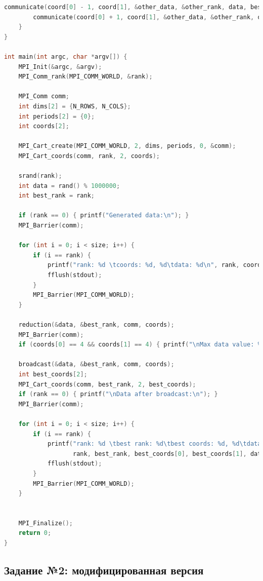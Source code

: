 \documentclass[a4paper]{article}
\begin{document}
\begin{lstlisting}[caption=transputer\_matrix.c, label={lst:1}, language=C]
        communicate(coord[0] - 1, coord[1], &other_data, &other_rank, data, best_rank, send, comm);
        communicate(coord[0] + 1, coord[1], &other_data, &other_rank, data, best_rank, send, comm);
    }
}

int main(int argc, char *argv[]) {
    MPI_Init(&argc, &argv);
    MPI_Comm_rank(MPI_COMM_WORLD, &rank);

    MPI_Comm comm;
    int dims[2] = {N_ROWS, N_COLS};
    int periods[2] = {0};
    int coords[2];

    MPI_Cart_create(MPI_COMM_WORLD, 2, dims, periods, 0, &comm);
    MPI_Cart_coords(comm, rank, 2, coords);

    srand(rank);
    int data = rand() % 1000000;
    int best_rank = rank;

    if (rank == 0) { printf("Generated data:\n"); }
    MPI_Barrier(comm);

    for (int i = 0; i < size; i++) {
        if (i == rank) {
            printf("rank: %d \tcoords: %d, %d\tdata: %d\n", rank, coords[0], coords[1], data);
            fflush(stdout);
        }
        MPI_Barrier(MPI_COMM_WORLD);
    }

    reduction(&data, &best_rank, comm, coords);
    MPI_Barrier(comm);
    if (coords[0] == 4 && coords[1] == 4) { printf("\nMax data value: %d\nMax data rank: %d\n", data, best_rank); }

    broadcast(&data, &best_rank, comm, coords);
    int best_coords[2];
    MPI_Cart_coords(comm, best_rank, 2, best_coords);
    if (rank == 0) { printf("\nData after broadcast:\n"); }
    MPI_Barrier(comm);

    for (int i = 0; i < size; i++) {
        if (i == rank) {
            printf("rank: %d \tbest rank: %d\tbest coords: %d, %d\tdata: %d\n",
                   rank, best_rank, best_coords[0], best_coords[1], data);
            fflush(stdout);
        }
        MPI_Barrier(MPI_COMM_WORLD);
    }


    MPI_Finalize();
    return 0;
}

\end{lstlisting}

\newpage

\subsection{Задание №2: модифицированная версия}
\end{document}
